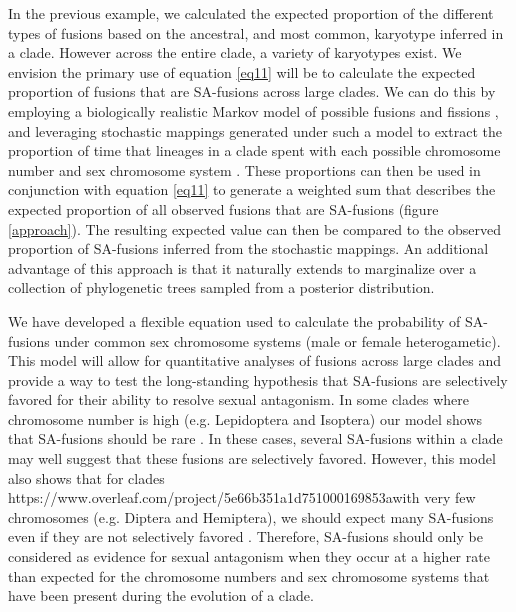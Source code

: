 \documentclass[12pt]{article}
\begin{document}
In the previous example, we calculated the expected proportion of the different types of fusions based on the ancestral, and most common, karyotype inferred in a clade.
However across the entire clade, a variety of karyotypes exist.
We envision the primary use of equation \ref{eq11} will be to calculate the expected proportion of fusions that are SA-fusions across large clades.
We can do this by employing a biologically realistic Markov model of possible fusions and fissions \citep{blackmon2019}, and leveraging stochastic mappings generated under such a model to extract the proportion of time that lineages in a clade spent with each possible chromosome number and sex chromosome system \citep{huelsenbeck2003, revell2012}.
These proportions can then be used in conjunction with equation \ref{eq11} to generate a weighted sum that describes the expected proportion of all observed fusions that are SA-fusions (figure \ref{approach}).
The resulting expected value can then be compared to the observed proportion of SA-fusions inferred from the stochastic mappings.
An additional advantage of this approach is that it naturally extends to marginalize over a collection of phylogenetic trees sampled from a posterior distribution.

We have developed a flexible equation used to calculate the probability of SA-fusions under common sex chromosome systems (male or female heterogametic).
This model will allow for quantitative analyses of fusions across large clades and provide a way to test the long-standing hypothesis that SA-fusions are selectively favored for their ability to resolve sexual antagonism.
In some clades where chromosome number is high (e.g. Lepidoptera and Isoptera) our model shows that SA-fusions should be rare \citep{blackmon2017}.
In these cases, several SA-fusions within a clade may well suggest that these fusions are selectively favored. 
However, this model also shows that for clades https://www.overleaf.com/project/5e66b351a1d751000169853awith very few chromosomes (e.g. Diptera and Hemiptera), we should expect many SA-fusions even if they are not selectively favored \citep{blackmon2017}.
Therefore, SA-fusions should only be considered as evidence for sexual antagonism when they occur at a higher rate than expected for the chromosome numbers and sex chromosome systems that have been present during the evolution of a clade.

\clearpage
\end{document}
